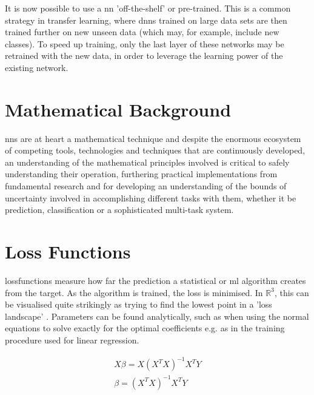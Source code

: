 It is now possible to use a \gls{nn} 'off-the-shelf' or pre-trained. This is a common strategy in transfer learning, where \gls{dnn}s trained on large data sets are then trained further on new unseen data (which may, for example, include new classes). To speed up training, only the last layer of these networks may be retrained with the new data, in order to leverage the learning power of the existing network. 
\bigskip

\section*{Mathematical Background}


\gls{nn}s are at heart a mathematical technique and despite the enormous ecosystem of competing tools, technologies and techniques that are continuously developed, an understanding of the mathematical principles involved  is critical to safely understanding their operation, furthering practical implementations from fundamental research and for developing an understanding of the bounds of uncertainty involved in accomplishing different tasks with them, whether it be prediction, classification or a sophisticated multi-task system.

\section{Loss Functions}

\gls{lossfunction}s measure how far the prediction a statistical or \gls{ml} algorithm creates from the target. As the algorithm is trained, the loss is minimised. In $\mathds{R}^3$, this can be visualised quite strikingly as trying to find the lowest point in a 'loss landscape' \cite{loss_landscape}. Parameters can be found analytically, such as when using the normal equations to solve exactly for the optimal coefficients e.g. as in the training procedure used for linear regression.
\bigskip

\begin{align*}
    \hat{X\beta} = X(X^TX)^{-1}X^TY \\
    \beta = (X^TX)^{-1}X^TY
\end{align*}

